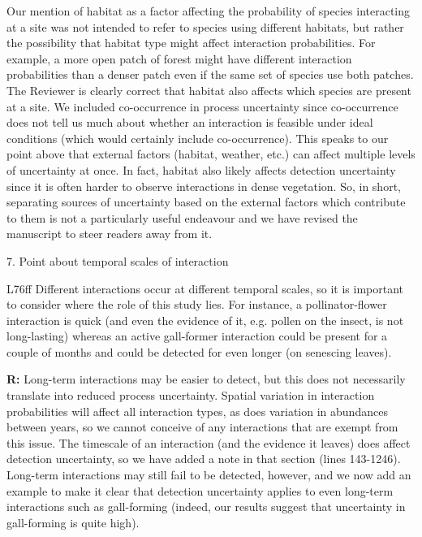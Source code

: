 \documentclass[12pt]{letter}
\newenvironment{refquote}{\bigskip \begin{it}}{\end{it}\smallskip}
\begin{document}
		Our mention of habitat as a factor affecting the probability of species interacting at a site was not intended to refer to species using different habitats, but rather the possibility that habitat type might affect interaction probabilities. For example, a more open patch of forest might have different interaction probabilities than a denser patch even if the same set of species use both patches. The Reviewer is clearly correct that habitat also affects which species are present at a site. We included co-occurrence in process uncertainty since co-occurrence does not tell us much about whether an interaction is feasible under ideal conditions (which would certainly include co-occurrence). This speaks to our point above that external factors (habitat, weather, etc.) can affect multiple levels of uncertainty at once. In fact, habitat also likely affects detection uncertainty since it is often harder to observe interactions in dense vegetation. So, in short, separating sources of uncertainty based on the external factors which contribute to them is not a particularly useful endeavour and we have revised the manuscript to steer readers away from it.


	7. Point about temporal scales of interaction


		\begin{refquote}
		L76ff Different interactions occur at different temporal scales, so it is important to consider where the role of this study lies. For instance, a pollinator-flower interaction is quick (and even the evidence of it, e.g. pollen on the insect, is not long-lasting) whereas an active gall-former interaction could be present for a couple of months and could be detected for even longer (on senescing leaves).
		\end{refquote}


		\textbf{R:} Long-term interactions may be easier to detect, but this does not necessarily translate into reduced process uncertainty. Spatial variation in interaction probabilities will affect all interaction types, as does variation in abundances between years, so we cannot conceive of any interactions that are exempt from this issue. The timescale of an interaction (and the evidence it leaves) does affect detection uncertainty, so we have added a note in that section (lines 143-1246). Long-term interactions may still fail to be detected, however, and we now add an example to make it clear that detection uncertainty applies to even long-term interactions such as gall-forming (indeed, our results suggest that uncertainty in gall-forming is quite high). 
\end{document}
